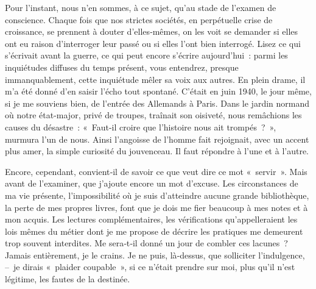 \documentclass[french,twoside]{book} %
\newcommand{\astermono}{\medskip\centerline{\color{rubric}\large\selectfont{\syms ✻}}\medskip\par}%
\begin{document}
Pour l’instant, nous n’en sommes, à ce sujet, qu’au stade de l’examen de conscience. Chaque fois que nos strictes sociétés, en perpétuelle crise de croissance, se prennent à douter d’elles‑mêmes, on les voit se demander si elles ont eu raison d’interroger leur passé ou si elles l’ont bien interrogé. Lisez ce qui s’écrivait avant la guerre, ce qui peut encore s’écrire aujour­d’hui : parmi les inquiétudes diffuses du temps présent, vous entendrez, presque immanquablement, cette inquiétude mêler sa voix aux autres. En plein drame, il m’a été donné d’en saisir l’écho tout spontané. C’était en juin 1940, le jour même, si je me souviens bien, de l’entrée des Allemands à Paris. Dans le jardin normand où notre état-major, privé de troupes, traînait son oisiveté, nous remâchions les causes du désastre : « Faut‑il croire que l’histoire nous ait trompés ? », murmura l’un de nous. Ainsi l’angoisse de l’homme fait rejoignait, avec un accent plus amer, la simple curiosité du jouvenceau. Il faut répondre à l’une et à l’autre.\par
Encore, cependant, convient‑il de savoir ce que veut dire ce mot « servir ». Mais avant de l’examiner, que j’ajoute encore un mot d’excuse. Les circonstances de ma vie présente, l’impossibilité où je suis d’atteindre aucune grande bibliothèque, la perte de mes propres livres, font que je dois me fier beaucoup à mes notes et à mon acquis. Les lectures complé­mentaires, les vérifications qu’appelleraient les lois mêmes du métier dont je me propose de décrire les pratiques me demeurent trop souvent interdites. Me sera‑t‑il donné un jour de combler ces lacunes ? Jamais entièrement, je le crains. Je ne puis, là‑dessus, que solliciter l’indulgence, – je dirais « plaider coupable », si ce n’était prendre sur moi, plus qu’il n’est légitime, les fautes de la destinée.\par

\astermono
\end{document}
